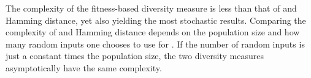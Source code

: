 The complexity of the fitness-based diversity measure is less than that of \dia{} and Hamming distance, yet also yielding the most stochastic results. Comparing the complexity of \dia{} and Hamming distance depends on the population size and how many random inputs one chooses to use for \dia{}. If the number of random inputs is just a constant times the population size, the two diversity measures asymptotically have the same complexity.
